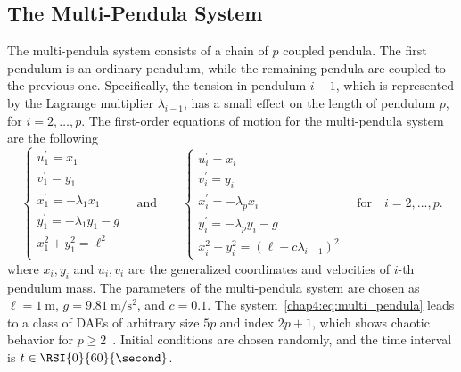 \subsection{The Multi-Pendula System}

The multi-pendula system consists of a chain of $p$ coupled pendula. The first pendulum is an ordinary pendulum, while the remaining pendula are coupled to the previous one. Specifically, the tension in pendulum $i - 1$, which is represented by the Lagrange multiplier $\lambda_{i-1}$, has a small effect on the length of
pendulum $p$, for $i = 2, \dots, p$. The first-order equations of motion for the multi-pendula system are the following~\cite{nedialkov2008solvingIII}
%
\begin{equation}
  \begin{cases}
    u_1^{\prime} = x_1 \\
    v_1^{\prime} = y_1 \\
    x_1^{\prime} = -\lambda_1 x_1 \\
    y_1^{\prime} = -\lambda_1 y_1 - g \\
    x_1^2 + y_1^2 = \ell^2 \\
  \end{cases}
  \quad \text{and} \qquad
  \begin{cases}
    u_i^{\prime} = x_i \\
    v_i^{\prime} = y_i \\
    x_i^{\prime} = -\lambda_p x_i \\
    y_i^{\prime} = -\lambda_p y_i - g \\
    x_i^2 + y_i^2 = (\ell + c\lambda_{i-1})^2
  \end{cases}
  \quad \text{for} \quad i = 2, \dots, p \text{.}
  \label{chap4:eq:multi_pendula}
\end{equation}
%
where $x_i, y_i$ and $u_i, v_i$ are the generalized coordinates and velocities of $i$-th pendulum mass. The parameters of the multi-pendula system are chosen as $\ell = \SI{1}{\meter}$, $g = \SI{9.81}{\meter\per\second\squared}$, and $c = 0.1$. The system~\eqref{chap4:eq:multi_pendula} leads to a class of \acp{DAE} of arbitrary size $5p$ and index $2p+1$, which shows chaotic behavior for $p \geq 2$~\cite{nedialkov2008solvingIII}. Initial conditions are chosen randomly, and the time interval is $t \in \RSI{0}{60}{\second}$.

